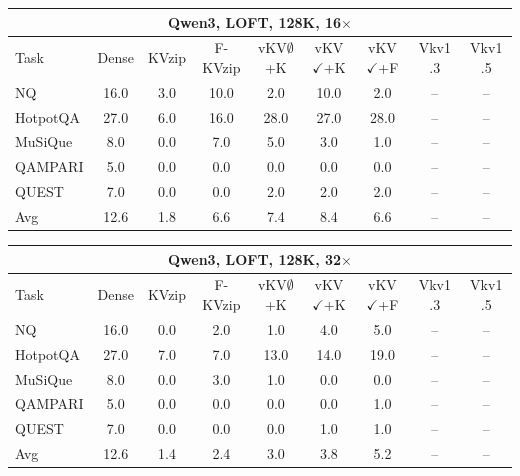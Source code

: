 \begin{tabular}{lcccccccc}
\toprule
\multicolumn{9}{c}{Qwen3, LOFT, 128K, 16$\times$} \\
\midrule
Task & Dense & KVzip & F-KVzip & vKV$\emptyset$+K & vKV$\checkmark$+K & vKV$\checkmark$+F & Vkv1 .3 & Vkv1 .5 \\
\midrule
NQ & 16.0 & 3.0 & 10.0 & 2.0 & 10.0 & 2.0 & -- & -- \\
HotpotQA & 27.0 & 6.0 & 16.0 & 28.0 & 27.0 & 28.0 & -- & -- \\
MuSiQue & 8.0 & 0.0 & 7.0 & 5.0 & 3.0 & 1.0 & -- & -- \\
QAMPARI & 5.0 & 0.0 & 0.0 & 0.0 & 0.0 & 0.0 & -- & -- \\
QUEST & 7.0 & 0.0 & 0.0 & 2.0 & 2.0 & 2.0 & -- & -- \\
\midrule
Avg & 12.6 & 1.8 & 6.6 & 7.4 & 8.4 & 6.6 & -- & -- \\
\bottomrule
\end{tabular}
\vspace{0.8em}

\begin{tabular}{lcccccccc}
\toprule
\multicolumn{9}{c}{Qwen3, LOFT, 128K, 32$\times$} \\
\midrule
Task & Dense & KVzip & F-KVzip & vKV$\emptyset$+K & vKV$\checkmark$+K & vKV$\checkmark$+F & Vkv1 .3 & Vkv1 .5 \\
\midrule
NQ & 16.0 & 0.0 & 2.0 & 1.0 & 4.0 & 5.0 & -- & -- \\
HotpotQA & 27.0 & 7.0 & 7.0 & 13.0 & 14.0 & 19.0 & -- & -- \\
MuSiQue & 8.0 & 0.0 & 3.0 & 1.0 & 0.0 & 0.0 & -- & -- \\
QAMPARI & 5.0 & 0.0 & 0.0 & 0.0 & 0.0 & 1.0 & -- & -- \\
QUEST & 7.0 & 0.0 & 0.0 & 0.0 & 1.0 & 1.0 & -- & -- \\
\midrule
Avg & 12.6 & 1.4 & 2.4 & 3.0 & 3.8 & 5.2 & -- & -- \\
\bottomrule
\end{tabular}
\vspace{0.8em}

